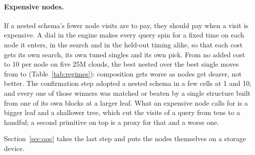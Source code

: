 \paragraph{Expensive nodes.} If a nested schema's fewer node visits are to pay, they should pay when a visit is expensive. A dial in the engine makes every query spin for a fixed time on each node it enters, in the search and in the held-out timing alike, so that each cost gets its own search, its own tuned singles and its own pick. From no added cost to 10\us{} per node on five 25M clouds, the best nested over the best single moves from \nodeCostNestedSingleZero{} to \nodeCostNestedSingleTenUs{} (Table~\ref{tab:regimes}): composition gets worse as nodes get dearer, not better. The confirmation step adopted a nested schema in a few cells at 1 and 10\us, and every one of those winners was matched or beaten by a single structure built from one of its own blocks at a larger leaf. What an expensive node calls for is a bigger leaf and a shallower tree, which cut the visits of a query from tens to a handful; a second primitive on top is a proxy for that and a worse one.

Section~\ref{sec:ooc} takes the last step and puts the nodes themselves on a storage device.
